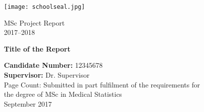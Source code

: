 \begin{titlepage}

  \begin{flushright}
   \texttt{[image: schoolseal.jpg]}
  \end{flushright}
  
  \begin{center}
    \LARGE
        MSc Project Report \\
        2017--2018
    \vspace*{1cm}
        
    \Huge
        \textbf{Title of the Report}
    \vspace{2.5cm}
        
    \LARGE
        \textbf{Candidate Number:} 12345678 \\
        \textbf{Supervisor:} Dr. Supervisor \\
    \vspace{0.5cm}
    \large
        Page Count:
    \vfill
    \Large
        Submitted in part fulfilment of the requirements for \\
        the degree of MSc in Medical Statistics \\
    \vspace{0.8cm}
    \large
        September 2017 \\
        
  \end{center}
  
\end{titlepage}


